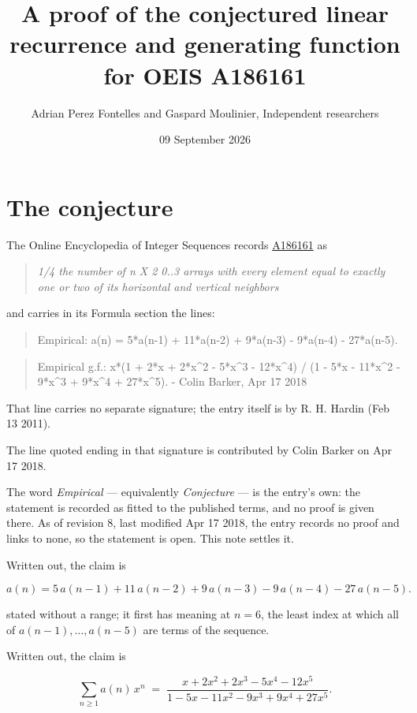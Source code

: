 \documentclass[11pt]{article}
\title{A proof of the conjectured linear recurrence and generating function for OEIS A186161}
\author{Adrian Perez Fontelles and Gaspard Moulinier, Independent researchers}
\date{09 September 2026}
\theoremstyle{definition}
\begin{document}
\maketitle
\section{The conjecture}

The Online Encyclopedia of Integer Sequences records \href{https://oeis.org/A186161}{A186161} as

\begin{quote}\itshape 1/4 the number of n X 2 0..3 arrays with every element equal to exactly one or two of its horizontal and vertical neighbors\end{quote}

and carries in its Formula section the lines:

\begin{quote}\ttfamily Empirical: a(n) = 5*a(n-1) + 11*a(n-2) + 9*a(n-3) - 9*a(n-4) - 27*a(n-5).\end{quote}

\begin{quote}\ttfamily Empirical g.f.: x*(1 + 2*x + 2*x\textasciicircum{}2 - 5*x\textasciicircum{}3 - 12*x\textasciicircum{}4) / (1 - 5*x - 11*x\textasciicircum{}2 - 9*x\textasciicircum{}3 + 9*x\textasciicircum{}4 + 27*x\textasciicircum{}5). - Colin Barker, Apr 17 2018\end{quote}

That line carries no separate signature; the entry itself is by R. H. Hardin (Feb 13 2011).

The line quoted ending in that signature is contributed by Colin Barker on Apr 17 2018.

The word {\itshape Empirical} --- equivalently {\itshape Conjecture} --- is the entry's own: the statement is recorded as fitted to the published terms, and no proof is given there. As of revision 8, last modified Apr 17 2018, the entry records no proof and links to none, so the statement is open. This note settles it.

Written out, the claim is

\[a(n) = 5\,a(n-1) + 11\,a(n-2) + 9\,a(n-3) - 9\,a(n-4) - 27\,a(n-5).\]

stated without a range; it first has meaning at $n = 6$, the least index at which all of $a(n-1),\dots,a(n-5)$ are terms of the sequence.

Written out, the claim is

\[\sum_{n \ge 1} a(n)\,x^n \;=\; \frac{x + 2x^{2} + 2x^{3} - 5x^{4} - 12x^{5}}{1 - 5x - 11x^{2} - 9x^{3} + 9x^{4} + 27x^{5}}.\]
\end{document}
